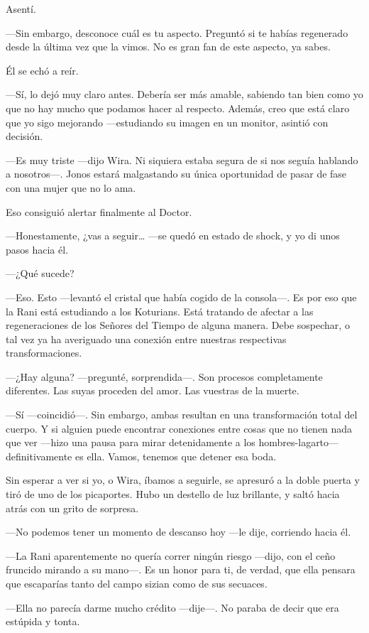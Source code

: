 Asentí.

---Sin embargo, desconoce cuál es tu aspecto. Preguntó si te habías
regenerado desde la última vez que la vimos. No es gran fan de este
aspecto, ya sabes.

Él se echó a reír.

---Sí, lo dejó muy claro antes. Debería ser más amable, sabiendo tan
bien como yo que no hay mucho que podamos hacer al respecto. Además,
creo que está claro que yo sigo mejorando ---estudiando su imagen en un
monitor, asintió con decisión.

---Es muy triste ---dijo Wira. Ni siquiera estaba segura de si nos
seguía hablando a nosotros---. Jonos estará malgastando su única
oportunidad de pasar de fase con una mujer que no lo ama.

Eso consiguió alertar finalmente al Doctor.

---Honestamente, ¿vas a seguir\ldots{} ---se quedó en estado de shock, y
yo di unos pasos hacia él.

---¿Qué sucede?

---Eso. Esto ---levantó el cristal que había cogido de la consola---. Es
por eso que la Rani está estudiando a los Koturians. Está tratando de
afectar a las regeneraciones de los Señores del Tiempo de alguna manera.
Debe sospechar, o tal vez ya ha averiguado una conexión entre nuestras
respectivas transformaciones.

---¿Hay alguna? ---pregunté, sorprendida---. Son procesos completamente
diferentes. Las suyas proceden del amor. Las vuestras de la muerte.

---Sí ---coincidió---. Sin embargo, ambas resultan en una transformación
total del cuerpo. Y si alguien puede encontrar conexiones entre cosas
que no tienen nada que ver ---hizo una pausa para mirar detenidamente a
los hombres-lagarto--- definitivamente es ella. Vamos, tenemos que
detener esa boda.

Sin esperar a ver si yo, o Wira, íbamos a seguirle, se apresuró a la
doble puerta y tiró de uno de los picaportes. Hubo un destello de luz
brillante, y saltó hacia atrás con un grito de sorpresa.

---No podemos tener un momento de descanso hoy ---le dije, corriendo
hacia él.

---La Rani aparentemente no quería correr ningún riesgo ---dijo, con el
ceño fruncido mirando a su mano---. Es un honor para ti, de verdad, que
ella pensara que escaparías tanto del campo sizian como de sus secuaces.

---Ella no parecía darme mucho crédito ---dije---. No paraba de decir
que era estúpida y tonta.

